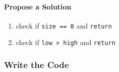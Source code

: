 \paragraph*{Propose a Solution}

\begin{enumerate}
    \item check if \texttt{size == 0} and \texttt{return}
    \item check if \texttt{low > high} and \texttt{return}
\end{enumerate}

\subsubsection{Write the Code}






